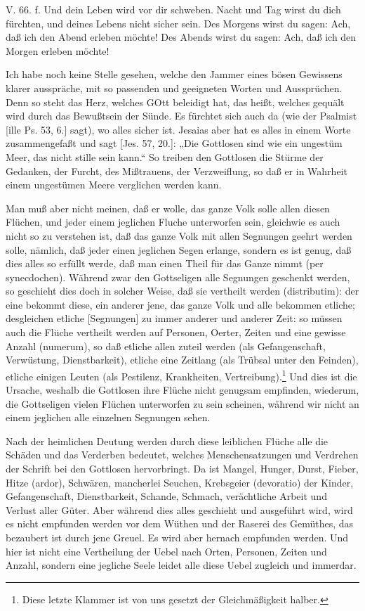 \begin{schriftzitat}
V. 66. f. Und dein Leben wird vor dir schweben. Nacht und Tag wirst du dich fürchten, und deines Lebens nicht sicher sein. Des Morgens wirst du sagen: Ach, daß ich den Abend erleben möchte! Des Abends wirst du sagen: Ach, daß ich den Morgen erleben möchte!
\end{schriftzitat}

Ich habe noch keine Stelle gesehen, welche den Jammer eines bösen Gewissens klarer ausspräche, mit so passenden und geeigneten Worten und Aussprüchen. Denn so steht das Herz, welches GOtt beleidigt hat, das heißt, welches gequält wird durch das Bewußtsein der Sünde. Es fürchtet sich auch da (wie der Psalmist [ille Ps. 53, 6.] sagt), wo alles sicher ist. Jesaias aber hat es alles in einem Worte zusammengefaßt und sagt [Jes. 57, 20.]: „Die Gottlosen sind wie ein ungestüm Meer, das nicht stille sein kann.“ So treiben den Gottlosen die Stürme der Gedanken, der Furcht, des Mißtrauens, der Verzweiflung, so daß er in Wahrheit einem ungestümen Meere verglichen werden kann.

Man muß aber nicht meinen, daß er wolle, das ganze Volk solle allen diesen Flüchen, und jeder einem jeglichen Fluche unterworfen sein, gleichwie es auch nicht so zu verstehen ist, daß das ganze Volk mit allen Segnungen geehrt werden solle, nämlich, daß jeder einen jeglichen Segen erlange, sondern es ist genug, daß dies alles so erfüllt werde, daß man einen Theil für das Ganze nimmt (per synecdochen). Während zwar den Gottseligen alle Segnungen geschenkt werden, so geschieht dies doch in solcher Weise, daß sie vertheilt werden (distributim): der eine bekommt diese, ein anderer jene, das ganze Volk und alle bekommen etliche; desgleichen etliche [Segnungen] zu immer anderer und anderer Zeit: so müssen auch die Flüche vertheilt werden auf Personen, Oerter, Zeiten und eine gewisse Anzahl (numerum), so daß etliche allen zuteil werden (als Gefangenschaft, Verwüstung, Dienstbarkeit), etliche eine Zeitlang (als Trübsal unter den Feinden), etliche einigen Leuten (als Pestilenz, Krankheiten, Vertreibung).\footnote{Diese letzte Klammer ist von uns gesetzt der Gleichmäßigkeit halber.} Und dies ist die Ursache, weshalb die Gottlosen ihre Flüche nicht genugsam empfinden, wiederum, die Gottseligen vielen Flüchen unterworfen zu sein scheinen, während wir nicht an einem jeglichen alle einzelnen Segnungen sehen.

Nach der heimlichen Deutung werden durch diese leiblichen Flüche alle die Schäden und das Verderben bedeutet, welches Menschensatzungen und Verdrehen der Schrift bei den Gottlosen hervorbringt. Da ist Mangel, Hunger, Durst, Fieber, Hitze (ardor), Schwären, mancherlei Seuchen, Krebsgeier (devoratio) der Kinder, Gefangenschaft, Dienstbarkeit, Schande, Schmach, verächtliche Arbeit und Verlust aller Güter. Aber während dies alles geschieht und ausgeführt wird, wird es nicht empfunden werden vor dem Wüthen und der Raserei des Gemüthes, das bezaubert ist durch jene Greuel. Es wird
aber hernach empfunden werden. Und hier ist nicht eine Vertheilung der Uebel nach Orten, Personen, Zeiten und Anzahl, sondern eine jegliche Seele leidet alle diese Uebel zugleich und immerdar.

